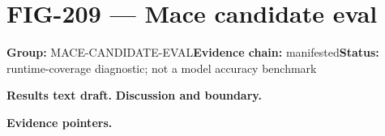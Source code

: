 \clearpage
\section{FIG-209 --- Mace candidate eval}
\label{figpage:fig-209}
\textbf{Group:} MACE-CANDIDATE-EVAL\quad \textbf{Evidence chain:} manifested\quad \textbf{Status:} runtime-coverage diagnostic; not a model accuracy benchmark

\textbf{Results text draft.} 
\textbf{Discussion and boundary.} 


\textbf{Evidence pointers.}



\vfill
